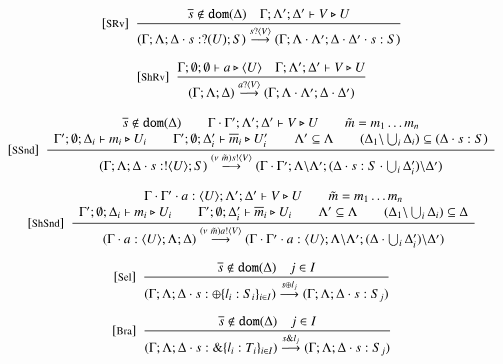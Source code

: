 \begin{figure}[t!]
	\[
	\begin{array}{c}
		{\footnotesize [\textrm{SRv}]}~~\displaystyle \frac { 
			\overline{s} \notin \mathtt{dom}(\Delta) \quad \Gamma; \Lambda'; \Delta' \vdash V \triangleright U
		 }{ 
			(\Gamma; \Lambda; \Delta \cdot s: ? (U) ; S) \stackrel{s ? \langle V \rangle}{\longrightarrow} (\Gamma; \Lambda\cdot\Lambda'; \Delta\cdot\Delta' \cdot s: S)
		 } 
		\\[8mm]

		{\footnotesize [\textrm{ShRv}]}~~\displaystyle \frac { 
			\Gamma; \emptyset; \emptyset \vdash a \triangleright \langle U \rangle
			\quad
			\Gamma; \Lambda'; \Delta' \vdash V \triangleright U
		 }{ 
			(\Gamma; \Lambda; \Delta) \stackrel{a ? \langle V \rangle}{\longrightarrow} (\Gamma; \Lambda\cdot\Lambda'; \Delta\cdot\Delta')
		 } 
		\\[8mm]

		{\footnotesize [\textrm{SSnd}]}~~\displaystyle \frac { 
			\begin{array}{c}
				\overline{s} \notin \mathtt{dom}(\Delta)
				\qquad 
				\Gamma \cdot \Gamma'; \Lambda'; \Delta' \vdash V \triangleright U
				\qquad
				\tilde{m} = m_1 \dots m_n
				\\
				\Gamma'; \emptyset; \Delta_i \vdash m_i \triangleright U_i
				\qquad
				\Gamma'; \emptyset; \Delta_i' \vdash \overline{m}_i \triangleright U'_i
				\qquad
				\Lambda' \subseteq \Lambda
				\qquad
				(\Delta_1 \backslash \bigcup_{i}\Delta_i) \subseteq (\Delta \cdot s: S)
			\end{array}
		 }{ 
			(\Gamma; \Lambda; \Delta \cdot s: ! \langle U \rangle ; S) \stackrel{(\nu\ \tilde{m}) s ! \langle V \rangle}{\longrightarrow} (\Gamma \cdot \Gamma'; \Lambda\backslash\Lambda';
			(\Delta \cdot s: S \cdot \bigcup_{i} \Delta'_i) \backslash \Delta')
		 } 
		\\[8mm]

		{\footnotesize [\textrm{ShSnd}]}~~\displaystyle \frac { 
			\begin{array}{c}
				\Gamma \cdot \Gamma' \cdot a: \langle U \rangle; \Lambda'; \Delta' \vdash V \triangleright U
				\qquad
				\tilde{m} = m_1 \dots m_n
				\\
				\Gamma'; \emptyset; \Delta_i \vdash m_i \triangleright U_i
				\qquad
				\Gamma'; \emptyset; \Delta'_i \vdash \overline{m}_i \triangleright U_i
				\qquad
				\Lambda' \subseteq \Lambda
				\qquad
				(\Delta_1 \backslash \bigcup_{i}\Delta_i) \subseteq \Delta
			\end{array}
		 }{ 
			(\Gamma \cdot a: \langle U \rangle ; \Lambda; \Delta) \stackrel{(\nu\ \tilde{m}) a ! \langle V \rangle}{\longrightarrow} (\Gamma \cdot \Gamma' \cdot a: \langle U \rangle; \Lambda\backslash\Lambda';
			(\Delta \cdot \bigcup_{i}\Delta'_i) \backslash \Delta')
		 } 
		\\[8mm]
		{\footnotesize [\textrm{Sel}]}~~\displaystyle \frac { 
			\overline{s} \notin \mathtt{dom}(\Delta) \quad j \in I
		 }{ 
			(\Gamma; \Lambda; \Delta \cdot s: \oplus \{l_i: S_i\}_{i \in I}) \stackrel{s \oplus l_j}{\longrightarrow} (\Gamma; \Lambda; \Delta \cdot s:S_j)
		 } 
		\\[8mm]
		{\footnotesize [\textrm{Bra}]}~~\displaystyle \frac { 
			\overline{s} \notin \mathtt{dom}(\Delta) \quad j \in I
		 }{ 
			(\Gamma; \Lambda; \Delta \cdot s: \& \{l_i: T_i\}_{i \in I}) \stackrel{s \& l_j}{\longrightarrow} (\Gamma; \Lambda; \Delta \cdot s:S_j)
		 } 
		\\[8mm]


\end{array}\]
\end{figure}
